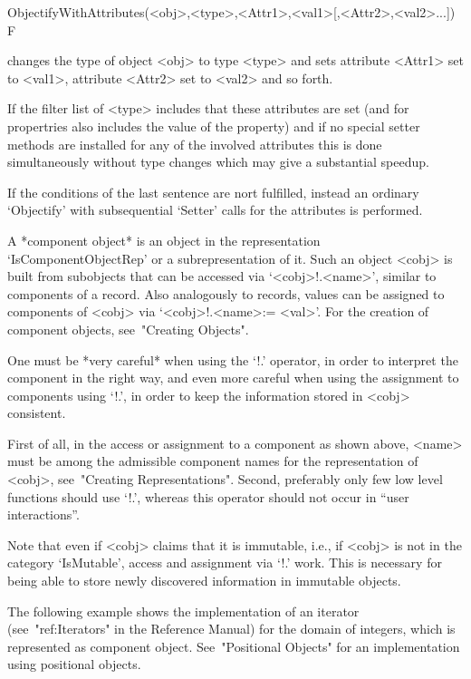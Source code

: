\>ObjectifyWithAttributes(<obj>,<type>,<Attr1>,<val1>[,<Attr2>,<val2>...]) F

changes the type of object <obj> to type <type> and sets
attribute <Attr1> set to <val1>, attribute
<Attr2> set to <val2> and so forth. 

If the filter list of <type> includes that these attributes are set (and for
propertries also includes the value of the property) and if no special
setter methods are installed for any of the involved attributes this is done
simultaneously without type changes which may give a substantial speedup.

If the conditions of the last sentence are nort fulfilled, instead an
ordinary `Objectify' with subsequential `Setter' calls for the attributes is
performed.


A *component object* is an object in the representation
`IsComponentObjectRep' or a subrepresentation of it.
Such an object <cobj> is built from subobjects that can be accessed via
`<cobj>!.<name>', similar to components of a record.
Also analogously to records, values can be assigned to components of
<cobj> via `<cobj>!.<name>:= <val>'.
For the creation of component objects, see~"Creating Objects".

One must be *very careful* when using the `!.' operator,
in order to interpret the component in the right way,
and even more careful when using the assignment to components using `!.',
in order to keep the information stored in <cobj> consistent.

First of all, in the access or assignment to a component as shown above,
<name> must be among the admissible component names
for the representation of <cobj>, see~"Creating Representations".
Second, preferably only few low level functions should use `!.',
whereas this operator should not occur in ``user interactions''.

Note that even if <cobj> claims that it is immutable, i.e., if <cobj>
is not in the category `IsMutable', access and assignment via `!.' work.
This is necessary for being able to store newly discovered information
in immutable objects.

The following example shows the implementation of an iterator
(see~"ref:Iterators" in the Reference Manual) for the domain of integers,
which is represented as component object.
See~"Positional Objects" for an implementation using positional objects.

